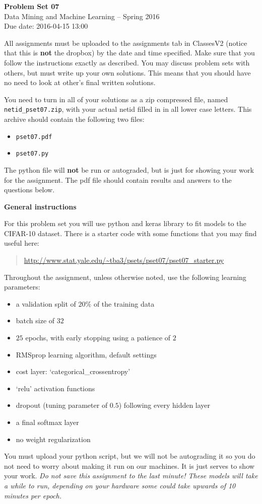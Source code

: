 \documentclass[12pt]{article}
\begin{document}
\begin{center}
{\bf Problem Set 07} \\
Data Mining and Machine Learning -- Spring 2016 \\
Due date: 2016-04-15 13:00
\end{center}

\medskip

All assignments must be uploaded to the assignments tab in ClassesV2
(notice that this is \textbf{not} the dropbox) by the date and time specified.
Make sure that you follow the instructions exactly as described.
You may discuss problem sets with others, but must write up your own
solutions. This means that you should have no need to look at other's
final written solutions.

You need to turn in all of your solutions as a zip compressed file, named
\texttt{netid\_pset07.zip}, with your actual netid filled in in all lower
case letters. This archive should contain the following two files:
\begin{itemize}
\item \texttt{pset07.pdf}
\item \texttt{pset07.py}
\end{itemize}
The python file will \textbf{not} be run or autograded, but is just for
showing your work for the assignment. The pdf file should contain results and
answers to the questions below.

\medskip

\textbf{General instructions}

For this problem set you will use python and keras library to fit models
to the CIFAR-10 dataset.
There is a starter code with some functions that you may find useful here:
\begin{quote}
\url{http://www.stat.yale.edu/~tba3/psets/pset07/pset07_starter.py}
\end{quote}
Throughout the assignment, unless otherwise noted, use the following
learning parameters:
\begin{itemize}
\item a validation split of $20\%$ of the training data
\item batch size of $32$
\item $25$ epochs, with early stopping using a patience of $2$
\item RMSprop learning algorithm, default settings
\item cost layer: `categorical\_crossentropy'
\item `relu' activation functions
\item dropout (tuning parameter of $0.5$) following every hidden layer
\item a final softmax layer
\item no weight regularization
\end{itemize}
You must upload your python script, but we will not be autograding it so
you do not need to worry about making it run on our machines. It is just
serves to show your work. \textit{Do not save this assignment to the last
minute! These models will take a while to run, depending on your hardware
some could take upwards of 10 minutes per epoch.}
\end{document}
